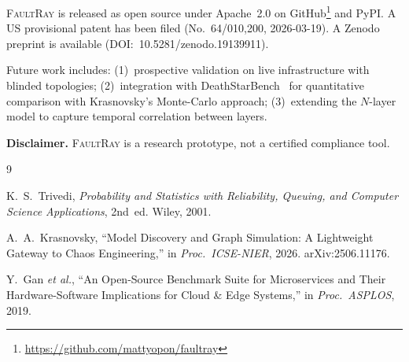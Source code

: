 \documentclass[conference,10pt]{IEEEtran}
\begin{document}
\textsc{FaultRay} is released as open source under Apache~2.0
on GitHub\footnote{\url{https://github.com/mattyopon/faultray}}
and PyPI. A US provisional patent has been filed
(No.~64/010,200, 2026-03-19). A Zenodo preprint is available
(DOI:~10.5281/zenodo.19139911).

Future work includes: (1)~prospective validation on live
infrastructure with blinded topologies; (2)~integration with
DeathStarBench~\cite{gan2019} for quantitative comparison with
Krasnovsky's Monte-Carlo approach; (3)~extending the $N$-layer
model to capture temporal correlation between layers.

\textbf{Disclaimer.} \textsc{FaultRay} is a research prototype,
not a certified compliance tool.


\begin{thebibliography}{9}

K.~S.~Trivedi,
\textit{Probability and Statistics with Reliability, Queuing, and
Computer Science Applications}, 2nd~ed.
Wiley, 2001.

A.~A.~Krasnovsky,
``Model Discovery and Graph Simulation: A Lightweight Gateway to
Chaos Engineering,''
in \textit{Proc.\ ICSE-NIER}, 2026.
arXiv:2506.11176.

Y.~Gan \textit{et al.},
``An Open-Source Benchmark Suite for Microservices and Their
Hardware-Software Implications for Cloud \& Edge Systems,''
in \textit{Proc.\ ASPLOS}, 2019.

\end{thebibliography}
\end{document}
